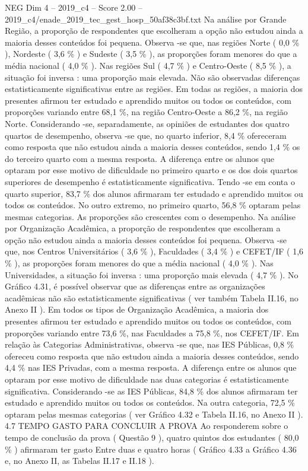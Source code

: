 \begin{textsample}{NEG Dim 4 – 2019\_c4 – Score 2.00 – 2019\_c4/enade\_2019\_tec\_gest\_hosp\_50af38c3bf.txt}
Na análise por Grande Região, a proporção de respondentes que escolheram a opção não estudou ainda a maioria desses conteúdos foi pequena.
Observa -se que, nas regiões Norte ( 0,0 \% ), Nordeste ( 3,6 \% ) e Sudeste ( 3,5 \% ), as proporções foram menores do que a média nacional ( 4,0 \% ).
Nas regiões Sul ( 4,7 \% ) e Centro-Oeste ( 8,5 \% ), a situação foi inversa : uma proporção mais elevada.
Não são observadas diferenças estatisticamente significativas entre as regiões.
Em todas as regiões, a maioria dos presentes afirmou ter estudado e aprendido muitos ou todos os conteúdos, com proporções variando entre 68,1 \%, na região Centro-Oeste a 86,2 \%, na região Norte.
Considerando -se, separadamente, as opiniões de estudantes dos quatro quartos de desempenho, observa -se que, no quarto inferior, 8,4 \% ofereceram como resposta que não estudou ainda a maioria desses conteúdos, sendo 1,4 \% os do terceiro quarto com a mesma resposta.
A diferença entre os alunos que optaram por esse motivo de dificuldade no primeiro quarto e os dos dois quartos superiores de desempenho é estatisticamente significativa.
Tendo -se em conta o quarto superior, 83,7 \% dos alunos afirmaram ter estudado e aprendido muitos ou todos os conteúdos.
No outro extremo, no primeiro quarto, 56,8 \% optaram pelas mesmas categorias.
As proporções são crescentes com o desempenho.
Na análise por Organização Acadêmica, a proporção de respondentes que escolheram a opção não estudou ainda a maioria desses conteúdos foi pequena.
Observa -se que, nos Centros Universitários ( 3,6 \% ), Faculdades ( 3,4 \% ) e CEFET/IF ( 1,6 \% ), as proporções foram menores do que a média nacional ( 4,0 \% ).
Nas Universidades, a situação foi inversa : uma proporção mais elevada ( 4,7 \% ).
No Gráfico 4.31, é possível observar que as diferenças entre as organizações acadêmicas não são estatisticamente significativas ( ver também Tabela II.16, no Anexo II ).
Em todos os tipos de Organização Acadêmica, a maioria dos presentes afirmou ter estudado e aprendido muitos ou todos os conteúdos, com proporções variando entre 73,6 \%, nas Faculdades a 75,8 \%, nos CEFET/IF.
Em relação às Categorias Administrativas, observa -se que, nas IES Públicas, 0,8 \% ofereceu como resposta que não estudou ainda a maioria desses conteúdos, sendo 4,4 \% nas IES Privadas, com a mesma resposta.
A diferença entre os alunos que optaram por esse motivo de dificuldade nas duas categorias é estatisticamente significativa.
Considerando -se as IES Públicas, 84,8 \% dos alunos afirmaram ter estudado e aprendido muitos ou todos os conteúdos.
Na outra categoria, 72,5 \% optaram pelas mesmas categorias ( ver Gráfico 4.32 e Tabela II.16, no Anexo II ). 4.7 TEMPO GASTO PARA CONCLUIR A PROVA Ao responderem sobre o tempo de conclusão da prova ( Questão 9 ), quatro quintos dos estudantes ( 80,0 \% ) afirmaram ter gasto Entre duas e quatro horas ( Gráfico 4.33 a Gráfico 4.36 e, no Anexo II, as Tabelas II.17 e II.18 ).

\end{textsample}
